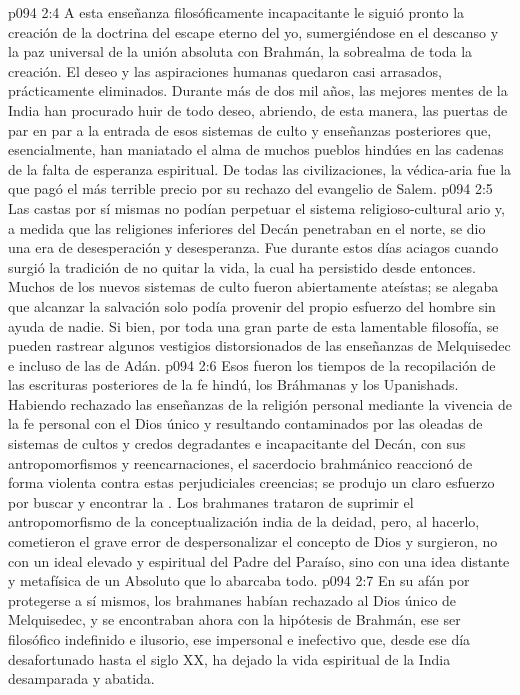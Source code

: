 \vs p094 2:4 A esta enseñanza filosóficamente incapacitante le siguió pronto la creación de la doctrina del escape eterno del yo, sumergiéndose en el descanso y la paz universal de la unión absoluta con Brahmán, la sobrealma de toda la creación. El deseo y las aspiraciones humanas quedaron casi arrasados, prácticamente eliminados. Durante más de dos mil años, las mejores mentes de la India han procurado huir de todo deseo, abriendo, de esta manera, las puertas de par en par a la entrada de esos sistemas de culto y enseñanzas posteriores que, esencialmente, han maniatado el alma de muchos pueblos hindúes en las cadenas de la falta de esperanza espiritual. De todas las civilizaciones, la védica\hyp{}aria fue la que pagó el más terrible precio por su rechazo del evangelio de Salem.
\vs p094 2:5 \pc Las castas por sí mismas no podían perpetuar el sistema religioso\hyp{}cultural ario y, a medida que las religiones inferiores del Decán penetraban en el norte, se dio una era de desesperación y desesperanza. Fue durante estos días aciagos cuando surgió la tradición de no quitar la vida, la cual ha persistido desde entonces. Muchos de los nuevos sistemas de culto fueron abiertamente ateístas; se alegaba que alcanzar la salvación solo podía provenir del propio esfuerzo del hombre sin ayuda de nadie. Si bien, por toda una gran parte de esta lamentable filosofía, se pueden rastrear algunos vestigios distorsionados de las enseñanzas de Melquisedec e incluso de las de Adán.
\vs p094 2:6 \pc Esos fueron los tiempos de la recopilación de las escrituras posteriores de la fe hindú, los Bráhmanas y los Upanishads. Habiendo rechazado las enseñanzas de la religión personal mediante la vivencia de la fe personal con el Dios único y resultando contaminados por las oleadas de sistemas de cultos y credos degradantes e incapacitante del Decán, con sus antropomorfismos y reencarnaciones, el sacerdocio brahmánico reaccionó de forma violenta contra estas perjudiciales creencias; se produjo un claro esfuerzo por buscar y encontrar la . Los brahmanes trataron de suprimir el antropomorfismo de la conceptualización india de la deidad, pero, al hacerlo, cometieron el grave error de despersonalizar el concepto de Dios y surgieron, no con un ideal elevado y espiritual del Padre del Paraíso, sino con una idea distante y metafísica de un Absoluto que lo abarcaba todo.
\vs p094 2:7 En su afán por protegerse a sí mismos, los brahmanes habían rechazado al Dios único de Melquisedec, y se encontraban ahora con la hipótesis de Brahmán, ese ser filosófico indefinido e ilusorio, ese  impersonal e inefectivo que, desde ese día desafortunado hasta el siglo XX, ha dejado la vida espiritual de la India desamparada y abatida.
